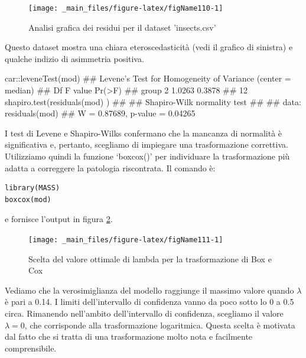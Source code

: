 \documentclass[a4paper,12pt,oneside]{book}
\newenvironment{Shaded}{}{}
\newcommand{\KeywordTok}[1]{#1}
\newcommand{\CommentTok}[1]{#1}
\newcommand{\OperatorTok}[1]{#1}
\newcommand{\NormalTok}[1]{#1}
\begin{document}
\begin{figure}

{\centering \texttt{[image: \_main\_files/figure-latex/figName110-1]} 

}

\caption{Analisi grafica dei residui per il dataset 'insects.csv'}\label{fig:figName110}
\end{figure}

Questo dataset mostra una chiara eteroscedasticità (vedi il grafico di sinistra) e qualche indizio di asimmetria positiva.

\begin{Shaded}
\begin{Highlighting}[]
\NormalTok{car}\OperatorTok{::}\KeywordTok{leveneTest}\NormalTok{(mod)}
\CommentTok{## Levene's Test for Homogeneity of Variance (center = median)}
\CommentTok{##       Df F value Pr(>F)}
\CommentTok{## group  2  1.0263 0.3878}
\CommentTok{##       12}
\KeywordTok{shapiro.test}\NormalTok{(}\KeywordTok{residuals}\NormalTok{(mod) )}
\CommentTok{## }
\CommentTok{##  Shapiro-Wilk normality test}
\CommentTok{## }
\CommentTok{## data:  residuals(mod)}
\CommentTok{## W = 0.87689, p-value = 0.04265}
\end{Highlighting}
\end{Shaded}

I test di Levene e Shapiro-Wilks confermano che la mancanza di normalità è significativa e, pertanto, scegliamo di impiegare una trasformazione correttiva. Utilizziamo quindi la funzione `boxcox()' per individuare la trasformazione più adatta a correggere la patologia riscontrata. Il comando è:

\begin{verbatim}
library(MASS)
boxcox(mod)
\end{verbatim}

e fornisce l'output in figura \ref{fig:figName111}.

\begin{figure}

{\centering \texttt{[image: \_main\_files/figure-latex/figName111-1]} 

}

\caption{Scelta del valore ottimale di lambda per la trasformazione di Box e Cox}\label{fig:figName111}
\end{figure}

Vediamo che la verosimiglianza del modello raggiunge il massimo valore quando \(\lambda\) è pari a 0.14. I limiti dell'intervallo di confidenza vanno da poco sotto lo 0 a 0.5 circa. Rimanendo nell'ambito dell'intervallo di confidenza, scegliamo il valore \(\lambda = 0\), che corrisponde alla trasformazione logaritmica. Questa scelta è motivata dal fatto che si tratta di una trasformazione molto nota e facilmente comprensibile.
\end{document}
